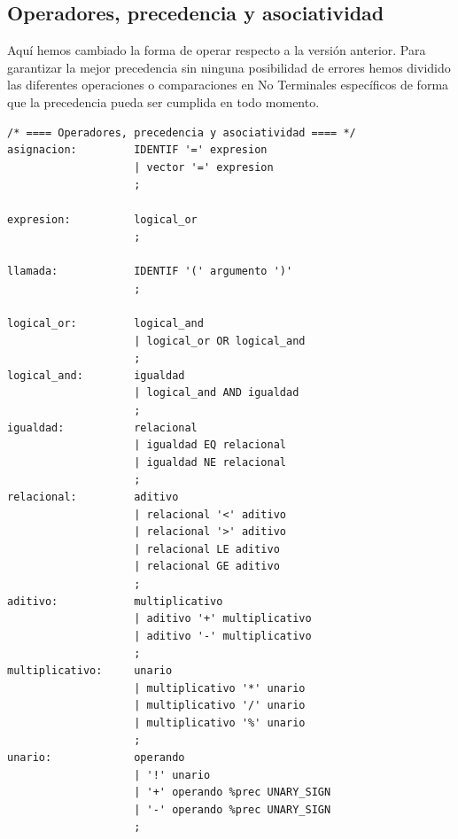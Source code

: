 \documentclass[12pt,a4paper]{article}
\begin{document}
\subsection{Operadores, precedencia y asociatividad}
\noindent Aquí hemos cambiado la forma de operar respecto a la versión anterior. Para garantizar 
la mejor precedencia sin ninguna posibilidad de errores hemos dividido las diferentes operaciones 
o comparaciones en No Terminales específicos de forma que la precedencia pueda ser cumplida en todo 
momento.
\begin{lstlisting}
/* ==== Operadores, precedencia y asociatividad ==== */
asignacion:         IDENTIF '=' expresion                               
                    | vector '=' expresion                              
                    ;

expresion:          logical_or                                         
                    ;

llamada:            IDENTIF '(' argumento ')'                           
                    ;

logical_or:         logical_and                                         
                    | logical_or OR logical_and                         
                    ;
logical_and:        igualdad                                            
                    | logical_and AND igualdad                          
                    ;
igualdad:           relacional                                          
                    | igualdad EQ relacional                            
                    | igualdad NE relacional                            
                    ;
relacional:         aditivo                                             
                    | relacional '<' aditivo                            
                    | relacional '>' aditivo                            
                    | relacional LE aditivo                             
                    | relacional GE aditivo                             
                    ;
aditivo:            multiplicativo                                      
                    | aditivo '+' multiplicativo                        
                    | aditivo '-' multiplicativo                        
                    ;
multiplicativo:     unario                                              
                    | multiplicativo '*' unario                        
                    | multiplicativo '/' unario                         
                    | multiplicativo '%' unario                         
                    ;
unario:             operando                                            
                    | '!' unario                                        
                    | '+' operando %prec UNARY_SIGN                     
                    | '-' operando %prec UNARY_SIGN                      
                    ;


\end{lstlisting}
\end{document}
